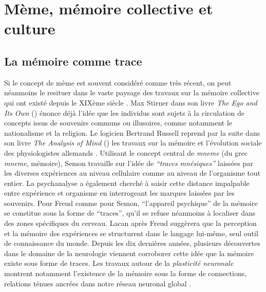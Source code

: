 \section[Mème, mémoire collective et culture]{Mème, mémoire collective et culture}
\subsection[La mémoire comme trace]{La mémoire comme trace}

Si le concept de mème est souvent considéré comme très récent, on peut néanmoins le resituer dans le vaste paysage des travaux sur la mémoire collective qui ont existé depuis le XIXème siècle \citep{Laurent1999}. Max Stirner dans son livre \textit{The Ego and Its Own} (\citeyear{Stirner1995}) énonce déjà l{\textquoteright}idée que les individus sont sujets à la circulation de concepts issus de souvenirs communs ou illusoires, comme notamment le nationalisme et la religion. Le logicien Bertrand Russell reprend par la suite dans son livre \textit{The Analysis of Mind } (\citeyear{Russell1921}) les travaux sur la mémoire et l{\textquoteright}évolution sociale des physiologistes allemands \cite{Semon1923}. Utilisant le concept central de \textit{mneme} (du grec 
\textit{mneme}, mémoire), Semon travaille sur l{\textquoteright}idée de \textit{{\textquotedblleft}traces mnésiques{\textquotedblright} }laissées par les diverses expériences au niveau cellulaire comme au niveau de l{\textquoteright}organisme tout entier. La psychanalyse a également cherché à saisir cette distance impalpable entre expérience et organisme en interrogeant les marques laissées par les souvenirs. Pour Freud comme pour Semon, {\textquotedblleft}l{\textquoteright}appareil psychique{\textquotedblright} de la mémoire se constitue sous la forme de {\textquotedblleft}traces{\textquotedblright}, qu{\textquoteright}il se refuse néanmoins à localiser dans des zones spécifiques du cerveau. Lacan après Freud suggèrera que la perception et la mémoire des expériences se structurent dans le langage lui-même, seul outil de connaissance du monde. Depuis les dix dernières années, plusieurs découvertes dans le domaine de la neurologie viennent corroborer cette idée que la mémoire existe sous forme de traces. Les travaux autour de la \textit{plasticité neuronale }montrent notamment l{\textquoteright}existence de la mémoire sous la forme de connections, relations ténues ancrées dans notre réseau neuronal global \citep{Magistretti2008}.  


